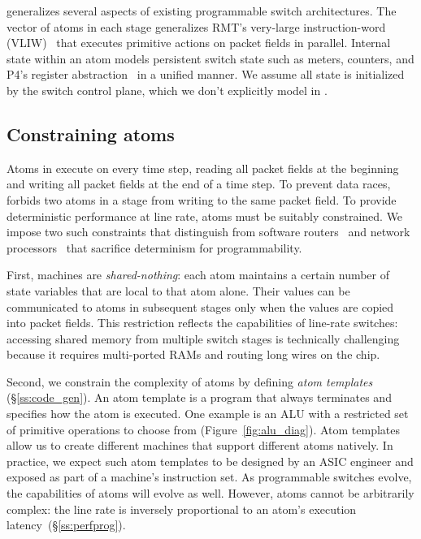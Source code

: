 \absmachine generalizes several aspects of existing programmable switch
architectures. The vector of atoms in each stage generalizes RMT's very-large
instruction-word (VLIW)~\cite{rmt} that executes primitive actions on packet
fields in parallel. Internal state within an atom models persistent switch
state such as meters, counters, and P4's register abstraction~\cite{p4spec} in
a unified manner. We assume all state is initialized by the switch control
plane, which we don't explicitly model in \absmachine.

\subsection{Constraining atoms}
\label{s:atomConstraints}

Atoms in \absmachine execute on every time step, reading all packet fields at
the beginning and writing all packet fields at the end of a time step. To
prevent data races, \absmachine forbids two atoms in a stage from writing to
the same packet field.  To provide deterministic performance at line rate,
atoms must be suitably constrained.  We impose two such constraints that
distinguish \absmachine from software routers~\cite{click} and network
processors~\cite{ixp4xx} that sacrifice determinism for programmability.

First, \absmachine machines are \textit{shared-nothing}: each atom maintains a
certain number of state variables that are local to that atom alone. Their
values can be communicated to atoms in subsequent stages only when the values
are copied into packet fields. This restriction reflects the capabilities of
line-rate switches: accessing shared memory from multiple switch stages is
technically challenging because it requires multi-ported RAMs and routing long
wires on the chip.

Second, we constrain the complexity of atoms by defining {\it atom templates}
(\S\ref{ss:code_gen}).  An atom template is a program that always terminates
and specifies how the atom is executed. One example is an ALU with a restricted
set of primitive operations to choose from (Figure~\ref{fig:alu_diag}). Atom
templates allow us to create different \absmachine machines that support
different atoms natively. In practice, we expect such atom templates to be
designed by an ASIC engineer and exposed as part of a \absmachine machine's
instruction set. As programmable switches evolve, the capabilities of atoms
will evolve as well. However, atoms cannot be arbitrarily complex: the line
rate is inversely proportional to an atom's execution
latency~(\S\ref{ss:perfprog}).


